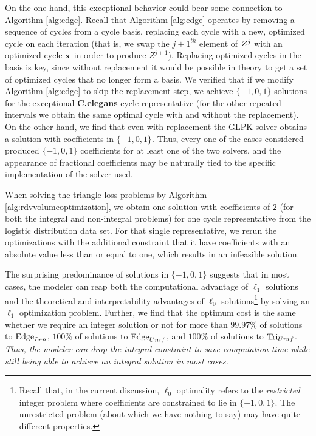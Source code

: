  
 On the one hand, this exceptional behavior could bear some connection to Algorithm \ref{alg:edge}.  
 Recall that Algorithm \ref{alg:edge} operates by removing a sequence of cycles from a cycle basis, replacing each cycle with a new, optimized cycle on each iteration (that is, we swap the $j+1^{th}$ element of $Z^{j}$ with an optimized cycle $\mathbf{x}$ in order to produce $Z^{j+1}$). Replacing optimized cycles in the basis is key, since without replacement it would be possible in theory to get a set of optimized cycles that no longer form a basis. We verified that if we modify Algorithm \ref{alg:edge} to skip the replacement step, we achieve $\{-1,0,1\}$ solutions for the exceptional \textbf{C.elegans} cycle representative (for the other repeated intervals we obtain the same optimal cycle with and without the replacement).  
 On the other hand, we find that even with replacement the GLPK solver obtains a solution with coefficients in $\{-1, 0, 1\}$.  Thus, every one of the cases considered produced $\{-1, 0, 1\}$ coefficients for at least one of the two solvers, and the appearance of fractional coefficients may be naturally tied to the specific  implementation of the solver used.


 When solving the triangle-loss problems by Algorithm \ref{alg:rdvvolumeoptimization}, we obtain one solution with coefficients of $2$ (for both the integral and non-integral problems) for one cycle representative from the logistic distribution data set. For that single representative, we rerun the optimizations with the additional constraint that it have coefficients with an absolute value less than or equal to one, which results in an infeasible solution. 

The surprising predominance of solutions in $\{-1, 0, 1\}$ suggests that in most cases, the modeler can reap both the computational advantage of $\ell_1$ solutions and the theoretical and interpretability advantages of $\ell_0$  solutions\footnote{Recall that, in the current discussion, $\ell_0$ optimality refers to the \emph{restricted} integer problem where coefficients are constrained to lie in $\{-1,0,1\}$.  The unrestricted problem (about which we have nothing to say) may have quite different properties.} by solving an $\ell_1$ optimization problem. Further, we find that the optimum cost is the same whether we require an integer solution or not for more than $99.97\%$ of solutions to \pr $\mathrm{Edge}_{Len}$, $100\%$ of solutions to $\mathrm{Edge}_{Unif}$, and $100\%$ of solutions to $\mathrm{Tri}_{Unif}$. \emph{Thus, the modeler can drop the integral constraint to save computation time while still being able to achieve an integral solution in most cases.}  

